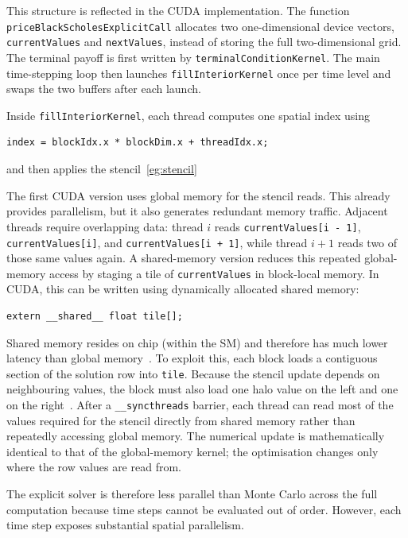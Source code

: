 \documentclass[11pt]{report}
\begin{document}
This structure is reflected in the CUDA implementation. 
The function \texttt{priceBlackScholesExplicitCall} 
allocates two one-dimensional device vectors, 
\texttt{currentValues}
and \texttt{nextValues}, instead of storing the
full two-dimensional grid. The terminal 
payoff is first written by \texttt{terminalConditionKernel}.
The main time-stepping loop
then launches \texttt{fillInteriorKernel} once per time 
level and swaps the two buffers after each launch.

Inside \texttt{fillInteriorKernel}, each thread computes 
one spatial index using
\begin{verbatim}
index = blockIdx.x * blockDim.x + threadIdx.x;
\end{verbatim}
and then applies the stencil~\ref{eg:stencil}

The first CUDA version uses global memory for the stencil reads. This already provides parallelism, but it also generates redundant memory traffic. Adjacent threads require overlapping
data: thread $i$ reads \texttt{currentValues[i - 1]}, \texttt{currentValues[i]}, and \texttt{currentValues[i + 1]}, while thread $i+1$ reads two of those same values again. A
shared-memory version reduces 
this repeated global-memory access by 
staging a tile of \texttt{currentValues} 
in block-local memory. In CUDA, this can 
be written using dynamically
allocated shared memory:

\begin{verbatim}
extern __shared__ float tile[];
\end{verbatim}

Shared memory resides on chip (within the SM) and 
therefore has much lower latency than global memory~\cite{harris2013sharedmemory}. 
To exploit this, each block loads a contiguous section 
of the solution row into \texttt{tile}. 
Because the stencil update depends on neighbouring 
values, the block must also load one halo value on 
the left and one on the right~\cite{alma991008772845408046}. 
After a \texttt{\_\_syncthreads} barrier, each thread can 
read most of the values required for the stencil directly 
from shared memory rather than repeatedly accessing global 
memory. The numerical update is mathematically identical 
to that of the global-memory kernel; the optimisation 
changes only where the row values are read from.

The explicit solver is therefore less parallel than 
Monte Carlo across the full computation because time steps 
cannot be evaluated out of order. However, each time step exposes
substantial spatial parallelism. 
\end{document}
